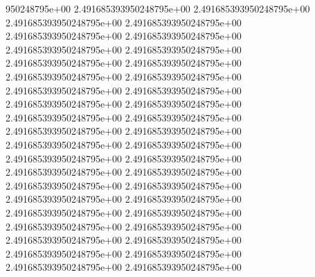 950248795e+00	2.491685393950248795e+00	2.491685393950248795e+00	2.491685393950248795e+00	2.491685393950248795e+00	2.491685393950248795e+00	2.491685393950248795e+00	2.491685393950248795e+00	2.491685393950248795e+00	2.491685393950248795e+00	2.491685393950248795e+00	2.491685393950248795e+00	2.491685393950248795e+00	2.491685393950248795e+00	2.491685393950248795e+00	2.491685393950248795e+00	2.491685393950248795e+00	2.491685393950248795e+00	2.491685393950248795e+00	2.491685393950248795e+00	2.491685393950248795e+00	2.491685393950248795e+00	2.491685393950248795e+00	2.491685393950248795e+00	2.491685393950248795e+00	2.491685393950248795e+00	2.491685393950248795e+00	2.491685393950248795e+00	2.491685393950248795e+00	2.491685393950248795e+00	2.491685393950248795e+00	2.491685393950248795e+00	2.491685393950248795e+00	2.491685393950248795e+00	2.491685393950248795e+00	2.491685393950248795e+00	2.491685393950248795e+00	2.491685393950248795e+00	2.491685393950248795e+00	2.491685393950248795e+00	2.491685393950248795e+00
